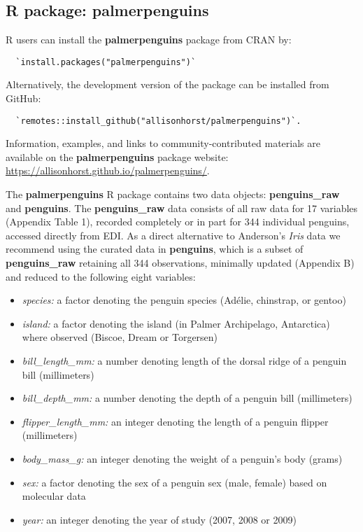 \hypertarget{r-package-palmerpenguins}{%
\subsection{\texorpdfstring{R package:
\textbf{palmerpenguins}}{R package: palmerpenguins}}\label{r-package-palmerpenguins}}

R users can install the \textbf{palmerpenguins} package from CRAN by:

\begin{verbatim}
  `install.packages("palmerpenguins")`
\end{verbatim}

Alternatively, the development version of the package can be installed
from GitHub:

\begin{verbatim}
  `remotes::install_github("allisonhorst/palmerpenguins")`. 
\end{verbatim}

Information, examples, and links to community-contributed materials are
available on the \textbf{palmerpenguins} package website:
\url{https://allisonhorst.github.io/palmerpenguins/}.

The \textbf{palmerpenguins} R package contains two data objects:
\textbf{penguins\_raw} and \textbf{penguins}. The \textbf{penguins\_raw}
data consists of all raw data for 17 variables (Appendix Table 1),
recorded completely or in part for 344 individual penguins, accessed
directly from EDI. As a direct alternative to Anderson's \emph{Iris}
data we recommend using the curated data in \textbf{penguins}, which is
a subset of \textbf{penguins\_raw} retaining all 344 observations,
minimally updated (Appendix B) and reduced to the following eight
variables:

\begin{itemize}
\tightlist
\item
  \emph{species:} a factor denoting the penguin species (Adélie,
  chinstrap, or gentoo)
\item
  \emph{island:} a factor denoting the island (in Palmer Archipelago,
  Antarctica) where observed (Biscoe, Dream or Torgersen)
\item
  \emph{bill\_length\_mm:} a number denoting length of the dorsal ridge
  of a penguin bill (millimeters)
\item
  \emph{bill\_depth\_mm:} a number denoting the depth of a penguin bill
  (millimeters)
\item
  \emph{flipper\_length\_mm:} an integer denoting the length of a
  penguin flipper (millimeters)
\item
  \emph{body\_mass\_g:} an integer denoting the weight of a penguin's
  body (grams)
\item
  \emph{sex:} a factor denoting the sex of a penguin sex (male, female)
  based on molecular data
\item
  \emph{year:} an integer denoting the year of study (2007, 2008 or
  2009)
\end{itemize}


